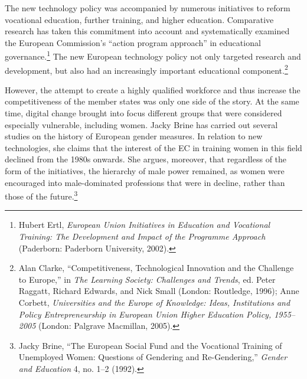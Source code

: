 \documentclass{tufte-handout}
\begin{document}
The new technology policy was accompanied by numerous initiatives to
reform vocational education, further training, and higher education.
Comparative research has taken this commitment into account and
systematically examined the European Commission's ``action program
approach'' in educational governance.\footnote{Hubert Ertl,
  \emph{European Union Initiatives in Education and Vocational Training:
  The Development and Impact of the Programme Approach} (Paderborn:
  Paderborn University, 2002).} The new European technology policy not
only targeted research and development, but also had an increasingly
important educational component.\footnote{Alan Clarke,
  ``Competitiveness, Technological Innovation and the Challenge to
  Europe,'' in \emph{The Learning Society: Challenges and Trends}, ed.
  Peter Raggatt, Richard Edwards, and Nick Small (London: Routledge,
  1996); Anne Corbett, \emph{Universities and the Europe of Knowledge:
  Ideas, Institutions and Policy Entrepreneurship in European Union
  Higher Education Policy, 1955--2005} (London: Palgrave Macmillan,
  2005).}

However, the attempt to create a highly qualified workforce and thus
increase the competitiveness of the member states was only one side of
the story. At the same time, digital change brought into focus different
groups that were considered especially vulnerable, including women.
Jacky Brine has carried out several studies on the history of European
gender measures. In relation to new technologies, she claims that the
interest of the EC in training women in this field declined from the
1980s onwards. She argues, moreover, that regardless of the form of the
initiatives, the hierarchy of male power remained, as women were
encouraged into male-dominated professions that were in decline, rather
than those of the future.\footnote{Jacky Brine, ``The European Social
  Fund and the Vocational Training of Unemployed Women: Questions of
  Gendering and Re-Gendering,'' \emph{Gender and Education} 4, no. 1--2
  (1992).}
\end{document}

